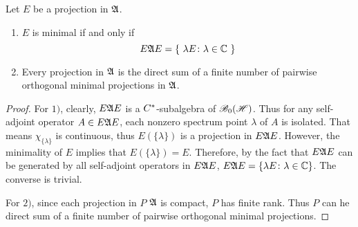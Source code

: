 \documentclass[a4paper,11pt]{report}
\begin{document}
\begin{prop}
	Let $E$ be a projection in $\mathfrak{A}$.
	\begin{enumerate}[label=\arabic*)]
		\item $E$ is minimal if and only if
		\begin{equation*}
			E\mathfrak{A} E = \{~\lambda E \colon \lambda \in \mathbb{C}~\}
		\end{equation*}
		\item Every projection in $\mathfrak{A}$ is the direct sum of a finite number of pairwise orthogonal minimal projections in $\mathfrak{A}$.
	\end{enumerate}
\end{prop}
\begin{proof}
	For $1)$, clearly, $E \mathfrak{A} E$ is a $C^{*}$-subalgebra of $\mathscr{B}_{0}\mathscr{(H)}$. Thus for any self-adjoint operator $A \in E \mathfrak{A} E$, each nonzero spectrum point $\lambda$ of $A$ is isolated. That means $\chi_{\{\lambda\}}$ is continuous, thus $E(\{\lambda\})$ is a projection in $E \mathfrak{A} E$. However, the minimality of $E$ implies that $E(\{\lambda\}) = E$. Therefore, by the fact that $E \mathfrak{A} E$ can be generated by all self-adjoint operators in $E \mathfrak{A} E$, $E\mathfrak{A} E = \{\lambda E \colon \lambda \in \mathbb{C}\}$. The converse is trivial.
	\item For $2)$, since each projection in $P$ $\mathfrak{A}$ is compact, $P$ has finite rank. Thus $P$ can he direct sum of a finite number of pairwise orthogonal minimal projections.
\end{proof}
\end{document}
